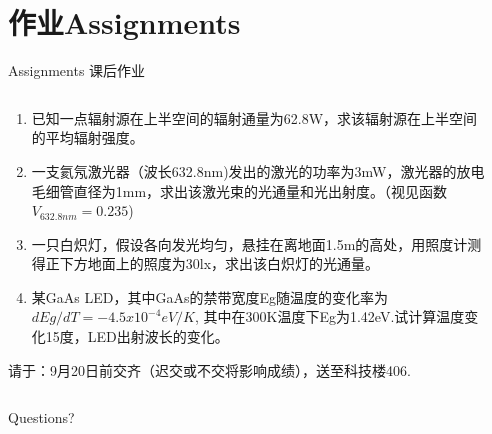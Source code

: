 \documentclass[trans]{beamer} %
\begin{document}
\section{作业Assignments}
\begin{frame}{Assignments}
课后作业
    \begin{columns}
        \begin{column}{0.9\textwidth}
        
        \begin{enumerate}[(1)]
    \item 已知一点辐射源在上半空间的辐射通量为62.8W，求该辐射源在上半空间的平均辐射强度。
    \item 一支氦氖激光器（波长632.8nm)发出的激光的功率为3mW，激光器的放电毛细管直径为1mm，求出该激光束的光通量和光出射度。（视见函数$V_{632.8nm}=0.235$)
    \item 一只白炽灯，假设各向发光均匀，悬挂在离地面1.5m的高处，用照度计测得正下方地面上的照度为30lx，求出该白炽灯的光通量。
    \item 某GaAs LED，其中GaAs的禁带宽度Eg随温度的变化率为$dEg/dT=-4.5x10^{-4}eV/K$, 其中在300K温度下Eg为1.42eV.试计算温度变化15度，LED出射波长的变化。
    \end{enumerate}
    \alert{请于：9月20日前交齐（迟交或不交将影响成绩），送至科技楼406.}
        \end{column}
        \begin{column}{0.1\textwidth}
    
        \end{column}
        \end{columns}
    
    
\end{frame}




\begin{frame}[standout]
  Questions?
\end{frame}
\end{document}
